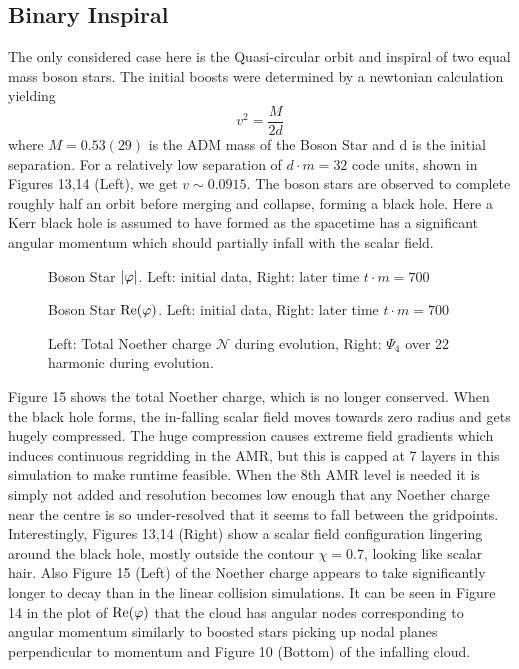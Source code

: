 \subsection{Binary Inspiral}
The only considered case here is the Quasi-circular orbit and inspiral of two equal mass boson stars. The initial boosts were determined by a newtonian calculation yielding 
\[ v^2 = \frac{M}{2d}\]
where $M=0.53(29)$ is the ADM mass of the Boson Star and d is the initial separation. For a relatively low separation of $d\cdot m =32$ code units, shown in Figures 13,14 (Left), we get $v \sim 0.0915$. The boson stars are observed to complete roughly half an orbit before merging and collapse, forming a black hole. Here a Kerr black hole is assumed to have formed as the spacetime has a significant angular momentum which should partially infall with the scalar field. 

  \begin{figure}[H]
  \caption{Boson Star $|\varphi|$. Left: initial data, Right: later time $t \cdot m = 700$}
  \centering
  \hfill
\end{figure}
  \begin{figure}[H]
  \caption{Boson Star $\Re(\varphi)$. Left: initial data, Right: later time $t \cdot m = 700$}
  \centering
  \hfill
\end{figure}
  \begin{figure}[H]
  \caption{Left: Total Noether charge $\mathcal{N}$ during evolution, Right: $\Psi_4$ over 22 harmonic during evolution.}
  \centering
  \hfill
\end{figure}
Figure 15 shows the total Noether charge, which is no longer conserved. When the black hole forms, the in-falling scalar field moves towards zero radius and gets hugely compressed. The huge compression causes extreme field gradients which induces continuous regridding in the AMR, but this is capped at 7 layers in this simulation to make runtime feasible. When the 8th AMR level is needed it is simply not added and resolution becomes low enough that any Noether charge near the centre is so under-resolved that it seems to fall between the gridpoints. Interestingly, Figures 13,14 (Right) show a scalar field configuration lingering around the black hole, mostly outside the contour $\chi=0.7$, looking like scalar hair. Also Figure 15 (Left) of the Noether charge appears to take significantly longer to decay than in the linear collision simulations. It can be seen in Figure 14 in the plot of $\Re(\varphi)$ that the cloud has angular nodes corresponding to angular momentum similarly to boosted stars picking up nodal planes perpendicular to momentum and Figure 10 (Bottom) of the infalling cloud. 

